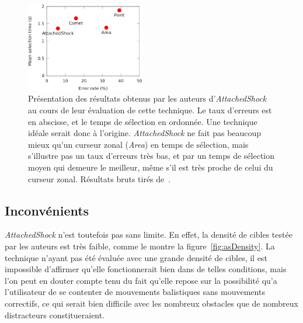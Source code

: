 	\begin{figure} %
		\centering
		\includegraphics[width=0.46\textwidth]{figures/ch2/asRes}
		\caption[\emph{AttachedShock}, performance]{Présentation des résultats obtenus par les auteurs d'\emph{AttachedShock} au cours de leur évaluation de cette technique. Le taux d'erreurs est en abscisse, et le temps de sélection en ordonnée. Une technique idéale serait donc à l'origine. \emph{AttachedShock} ne fait pas beaucoup mieux qu'un curseur zonal (\emph{Area}) en temps de sélection, mais s'illustre pas un taux d'erreurs très bas, et par un temps de sélection moyen qui demeure le meilleur, même s'il est très proche de celui du curseur zonal. Résultats bruts tirés de~\cite{you2012attachedshock}.}
		\label{fig:asRes}
	\end{figure}

	\subsection{Inconvénients}
	\emph{AttachedShock} n'est toutefois pas sans limite. En effet, la densité de cibles testée par les auteurs est très faible, comme le montre la figure~\ref{fig:asDensity}. La technique n'ayant pas été évaluée avec une grande densité de cibles, il est impossible d'affirmer qu'elle fonctionnerait bien dans de telles conditions, mais l'on peut en douter compte tenu du fait qu'elle repose sur la possibilité qu'a l'utilisateur de se \og contenter \fg{} de mouvements balistiques sans mouvements correctifs, ce qui serait bien difficile avec les nombreux obstacles que de nombreux distracteurs constitueraient.
	
